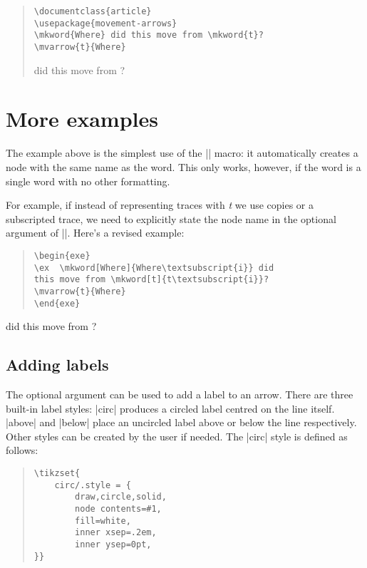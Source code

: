 \documentclass[11pt]{article}
\begin{document}
\begin{quote}
\begin{lstlisting}
\documentclass{article}
\usepackage{movement-arrows}
\mkword{Where} did this move from \mkword{t}?
\mvarrow{t}{Where}
\end{lstlisting}
 did this move from ?
\end{quote}

\section{More examples}

The example above is the simplest use of the |\mkword| macro: it automatically creates a node with the same name as the word.  This only works, however, if the word is a single word with no other formatting. 

For example, if instead of representing traces with \emph{t} we use copies or a subscripted trace, we need to explicitly state the node name in the optional argument of |\mkword|.  Here’s a revised example:
\begin{quote}
\begin{lstlisting}
\begin{exe}
\ex  \mkword[Where]{Where\textsubscript{i}} did 
this move from \mkword[t]{t\textsubscript{i}}?
\mvarrow{t}{Where}
\end{exe}
\end{lstlisting}
\end{quote}

\begin{exe}
\ex  
{} did this move from ?
\label{where2}
\end{exe}
\subsection{Adding labels}
The optional argument can be used to add a label to an arrow.  There are three built-in label styles:  |circ| produces a circled label centred on the line itself. |above| and |below| place an uncircled label above or below the line respectively. Other styles can be created by the user if needed.  The |circ| style is defined as follows:

\begin{quote}
\begin{lstlisting}
\tikzset{
	circ/.style = {
  		draw,circle,solid,
  		node contents=#1,
  		fill=white,
  		inner xsep=.2em,
  		inner ysep=0pt,
}}
\end{lstlisting}
\end{quote}
\end{document}
